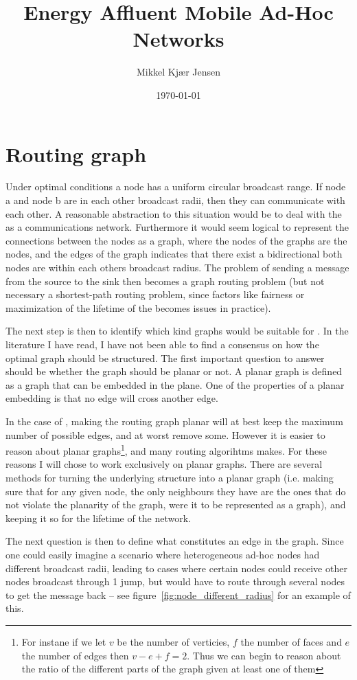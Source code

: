 \documentclass[letter, 12pt, english, draft]{article}
\title{Energy Affluent Mobile Ad-Hoc Networks}
\author{Mikkel Kjær Jensen}
\date{\today}
\begin{document}
\pagestyle{plain}

\section{Routing graph}

Under optimal conditions a node has a uniform circular broadcast range. If node a and node b are in each other broadcast radii, then they can communicate with each other. A reasonable abstraction to this situation would be to deal with the \manet as a communications network. Furthermore it would seem logical to represent the connections between the nodes as a graph, where the nodes of the graphs are the \manet nodes, and the edges of the graph indicates that there exist a bidirectional both nodes are within each others broadcast radius. The problem of sending a message from the source to the sink then becomes a graph routing problem (but not necessary a shortest-path routing problem, since factors like fairness or maximization of the lifetime of the \manet becomes issues in practice).

The next step is then to identify which kind graphs would be suitable for \manet. In the literature I have read, I have not been able to find a consensus on how the optimal graph should be structured. The first important question to answer should be whether the graph should be planar or not. A planar graph is defined as a graph that can be embedded in the plane. One of the properties of a planar embedding is that no edge will cross another edge. 

In the case of \manet, making the routing graph planar will at best keep the maximum number of possible edges, and at worst remove some. However it is easier to reason about planar graphs\footnote{For instane if we let $v$ be the number of verticies, $f$ the number of faces and $e$ the number of edges then $v - e + f = 2$. Thus we can begin to reason about the ratio of the different parts of the graph given at least one of them}, and many routing algorihtms makes. For these reasons I will chose to work exclusively on planar graphs. There are several methods for turning the underlying structure into a planar graph (i.e. making sure that for any given node, the only neighbours they have are the ones that do not violate the planarity of the graph, were it to be represented as a graph), and keeping it so for the lifetime of the network. 

The next question is then to define what constitutes an edge in the graph. Since one could easily imagine a scenario where heterogeneous ad-hoc nodes had different broadcast radii, leading to cases where certain nodes could receive other nodes broadcast through 1 jump, but would have to route through several nodes to get the message back -- see figure~\ref{fig:node_different_radius} for an example of this.
\end{document}
